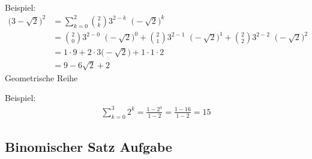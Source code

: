 \begin{center}
	\
\end{center}
Beispiel:\\
\begin{align*}
	\big(3-\sqrt{2}\big)^2&=\sum\limits_{k=0}^{2}\binom{2}{k}3^{2-k}\;\;\big(-\sqrt{2}\big)^k\\
	&=\binom{2}{0}3^{2-0}\;\;\big(-\sqrt{2}\big)^0+\binom{2}{1}3^{2-1}\;\;\big(-\sqrt{2}\big)^1+\binom{2}{2}3^{2-2}\;\;\big(-\sqrt{2}\big)^2\\
	&=1\cdot 9+2\cdot 3\big(-\sqrt{2}\big)+1\cdot 1\cdot 2\\
	&=9-6\sqrt{2}+2
\end{align*}
\textbullet\;\;Geometrische Reihe
\begin{center}
\end{center}
Beispiel:\\
\begin{align*}
	\sum\limits_{k=0}^{3}2^k=\frac{1-2^4}{1-2}=\frac{1-16}{1-2}=15
\end{align*}
\newpage
\subsection{Binomischer Satz Aufgabe}

